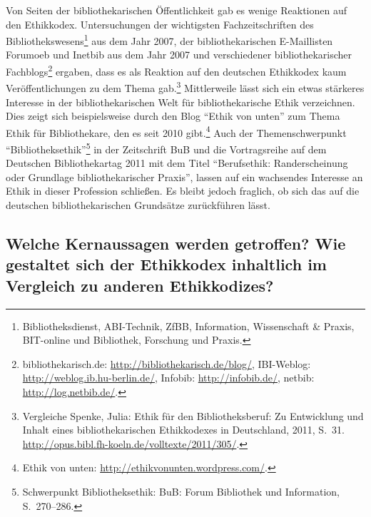 \documentclass[output=paper]{langscibook}
\begin{document}
Von Seiten der bibliothekarischen Öffentlichkeit gab es wenige
Reaktionen auf den Ethikkodex. Untersuchungen der wichtigsten
Fachzeitschriften des Bibliothekswesens\footnote{Bibliotheksdienst,
  ABI-Technik, ZfBB, Information, Wissenschaft \& Praxis, BIT-online und
  Bibliothek, Forschung und Praxis.} aus dem Jahr 2007, der
bibliothekarischen E-Maillisten Forumoeb und Inetbib aus dem Jahr 2007
und verschiedener bibliothekarischer Fachblogs\footnote{bibliothekarisch.de:
  \url{http://bibliothekarisch.de/blog/}, IBI-Weblog:
  \url{http://weblog.ib.hu-berlin.de/}, Infobib:
  \url{http://infobib.de/}, netbib: \url{http://log.netbib.de/}.}
ergaben, dass es als Reaktion auf den deutschen Ethikkodex kaum
Veröffentlichungen zu dem Thema gab.\footnote{Vergleiche Spenke, Julia: Ethik
  für den Bibliotheksberuf: Zu Entwicklung und Inhalt eines
  bibliothekarischen Ethikkodexes in Deutschland, 2011, S.~31.
  \url{http://opus.bibl.fh-koeln.de/volltexte/2011/305/}.} Mittlerweile
lässt sich ein etwas stärkeres Interesse in der bibliothekarischen Welt
für bibliothekarische Ethik verzeichnen. Dies zeigt sich beispielsweise
durch den Blog \enquote{Ethik von unten} zum Thema Ethik für
Bibliothekare, den es seit 2010 gibt.\footnote{Ethik von unten:
  \url{http://ethikvonunten.wordpress.com/}.} Auch der Themenschwerpunkt
\enquote{Bibliotheksethik}\footnote{Schwerpunkt Bibliotheksethik: BuB:
  Forum Bibliothek und Information, S.~270--286.} in der Zeitschrift BuB
und die Vortragsreihe auf dem Deutschen Bibliothekartag 2011 mit dem
Titel \enquote{Berufsethik: Randerscheinung oder Grundlage
bibliothekarischer Praxis}, lassen auf ein wachsendes Interesse an Ethik
in dieser Profession schließen. Es bleibt jedoch fraglich, ob sich das
auf die deutschen bibliothekarischen Grundsätze zurückführen lässt.

\hypertarget{welche-kernaussagen-werden-getroffen-wie-gestaltet-sich-der-ethikkodex-inhaltlich-im-vergleich-zu-anderen-ethikkodizes}{%
\subsection*{Welche Kernaussagen werden getroffen? Wie gestaltet sich der
Ethikkodex inhaltlich im Vergleich zu anderen
Ethikkodizes?}\label{welche-kernaussagen-werden-getroffen-wie-gestaltet-sich-der-ethikkodex-inhaltlich-im-vergleich-zu-anderen-ethikkodizes}}
\end{document}
